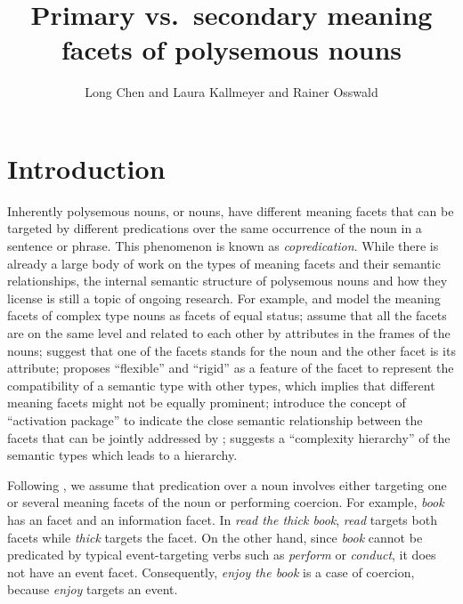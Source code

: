 \documentclass[output=paper,colorlinks,citecolor=brown,chinesefont]{langscibook}
\author{Long Chen\orcid{0000-0003-2294-8321}\affiliation{Heinrich Heine University Düsseldorf} and       Laura Kallmeyer\orcid{0000-0001-9691-5990}\affiliation{Heinrich Heine University Düsseldorf} and       Rainer Osswald\orcid{0009-0006-5872-5241}\affiliation{Heinrich Heine University Düsseldorf}}
\title{Primary vs.\ secondary meaning facets of polysemous nouns}
\begin{document}
\maketitle

\section{Introduction}

Inherently polysemous nouns, or  nouns, have different meaning facets that can be targeted by different predications over the same occurrence of the noun in a sentence or phrase.
This phenomenon is known as \emph{copredication}.
While there is already a large body of work on the types of meaning facets and their semantic relationships, the internal semantic structure of polysemous nouns and how they license  is still a topic of ongoing research.
For example, \citet{Pustejovsky:1995} and \citet{asher2011lexical} model the meaning facets of complex type nouns as facets of equal status; \citet{chen2022frame} assume that all the facets are on the same level and related to each other by attributes in the frames of the nouns; \citet{babonnaud2016polysemy} suggest that one of the facets stands for the noun and the other facet is its attribute; \citet{Retore:14} proposes ``flexible'' and ``rigid'' as a feature of the facet to represent the compatibility of a semantic type with other types, which implies that different meaning facets might not be equally prominent; \citet{ortega2019polysemy} introduce the concept of ``activation package'' to indicate the close semantic relationship between the facets that can be jointly addressed by ; \citet{murphy2021predicate} suggests a ``complexity hierarchy'' of the semantic types which leads to a  hierarchy.

Following \citet{chen2022frame}, we assume that predication over a noun involves either targeting %
 one or several  meaning facets of the noun or performing coercion. For example, \emph{book} has an  facet and an information facet. In \emph{read the thick book}, \emph{read} targets both facets while \emph{thick} targets the  facet.
On the other hand, since \emph{book} cannot be predicated by typical event-targeting verbs such as \emph{perform} or \emph{conduct}, it does not have an event facet.
Consequently, \emph{enjoy the book} is a case of coercion, because \emph{enjoy} targets an event.
\end{document}

